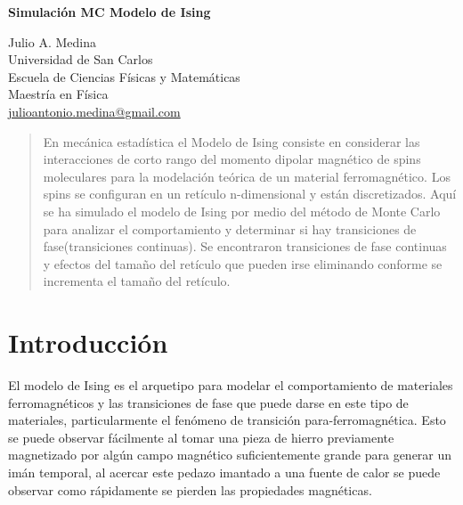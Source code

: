 \documentclass[a4paper]{article}
\begin{document}

\Large
 \begin{center}
\textbf{Simulación MC Modelo de Ising}\


\hspace{10pt}

\large
Julio A. Medina \\
\hspace{10pt}
\small  
 Universidad de San Carlos\\
Escuela de Ciencias Físicas y Matemáticas\\
Maestría en Física\\
\href{mailto:julioantonio.medina@gmail.com}{julioantonio.medina@gmail.com}\\

\end{center}

\hspace{10pt}

\begin{abstract}
En mecánica estadística el Modelo de Ising consiste en considerar las interacciones de corto rango del momento dipolar magnético de spins moleculares para la modelación teórica de un material ferromagnético. Los spins se configuran en un retículo n-dimensional y están discretizados. Aquí se ha simulado el modelo de Ising por medio del método de Monte Carlo para analizar el comportamiento y determinar si hay transiciones de fase(transiciones continuas). Se encontraron transiciones de fase continuas y efectos del tamaño del retículo que pueden irse eliminando conforme se incrementa el tamaño del retículo.

\end{abstract}

\normalsize
\section{Introducción}
El modelo de Ising es el arquetipo para modelar el comportamiento de materiales ferromagnéticos y las transiciones de fase que puede darse en este tipo de materiales, particularmente el fenómeno de transición para-ferromagnética. Esto se puede observar fácilmente al tomar una pieza de hierro previamente magnetizado por algún campo magnético suficientemente grande para generar un imán temporal, al acercar este pedazo imantado a una fuente de calor se puede observar como rápidamente se pierden las propiedades magnéticas.
\end{document}
